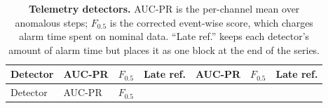 \documentclass[3p,times]{elsarticle}
\begin{document}
\begin{longtable}[]{@{}
  >{\raggedright\arraybackslash}p{}
  >{\raggedleft\arraybackslash}p{}
  >{\raggedleft\arraybackslash}p{}
  >{\raggedleft\arraybackslash}p{}
  >{\raggedleft\arraybackslash}p{}
  >{\raggedleft\arraybackslash}p{}
  >{\raggedleft\arraybackslash}p{}@{}}
\caption{\textbf{Telemetry detectors.} AUC-PR is the per-channel mean
over anomalous steps; \(F_{0.5}\) is the corrected event-wise score,
which charges alarm time spent on nominal data. ``Late ref.'' keeps each
detector's amount of alarm time but places it as one block at the end of
the series.}\label{tbl:telemetry}\tabularnewline
\toprule\noalign{}
\begin{minipage}[b]{\linewidth}\raggedright
Detector
\end{minipage} & \begin{minipage}[b]{\linewidth}\raggedleft
AUC-PR
\end{minipage} & \begin{minipage}[b]{\linewidth}\raggedleft
\(F_{0.5}\)
\end{minipage} & \begin{minipage}[b]{\linewidth}\raggedleft
Late ref.
\end{minipage} & \begin{minipage}[b]{\linewidth}\raggedleft
AUC-PR
\end{minipage} & \begin{minipage}[b]{\linewidth}\raggedleft
\(F_{0.5}\)
\end{minipage} & \begin{minipage}[b]{\linewidth}\raggedleft
Late ref.
\end{minipage} \\
\midrule\noalign{}
\endfirsthead
\toprule\noalign{}
\begin{minipage}[b]{\linewidth}\raggedright
Detector
\end{minipage} & \begin{minipage}[b]{\linewidth}\raggedleft
AUC-PR
\end{minipage} & \begin{minipage}[b]{\linewidth}\raggedleft
\(F_{0.5}\)
\end{minipage} & \begin{minipage}[b]{\linewidth}\raggedleft

\end{minipage}
\end{longtable}
\end{document}
